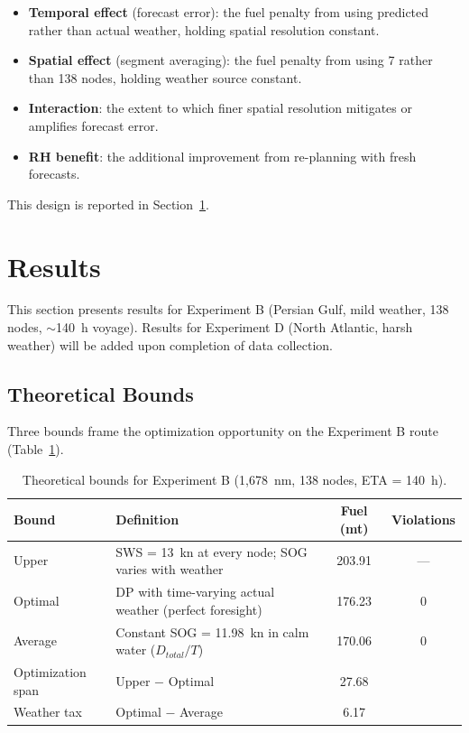 \documentclass[review]{elsarticle}
\begin{document}
\begin{itemize}
    \item \textbf{Temporal effect} (forecast error): the fuel penalty from using predicted rather than actual weather, holding spatial resolution constant.
    \item \textbf{Spatial effect} (segment averaging): the fuel penalty from using 7 rather than 138 nodes, holding weather source constant.
    \item \textbf{Interaction}: the extent to which finer spatial resolution mitigates or amplifies forecast error.
    \item \textbf{RH benefit}: the additional improvement from re-planning with fresh forecasts.
\end{itemize}

This design is reported in Section~\ref{sec:results}.


\section{Results}
\label{sec:results}

This section presents results for Experiment B (Persian Gulf, mild weather, 138 nodes, $\sim$140~h voyage). Results for Experiment D (North Atlantic, harsh weather) will be added upon completion of data collection.

\subsection{Theoretical Bounds}
\label{sec:results-bounds}

Three bounds frame the optimization opportunity on the Experiment B route (Table~\ref{tab:bounds}).

\begin{table}[htbp]
\centering
\caption{Theoretical bounds for Experiment B (1,678~nm, 138 nodes, ETA = 140~h).}
\label{tab:bounds}
\begin{tabular}{llcc}
\toprule
Bound & Definition & Fuel (mt) & Violations \\
\midrule
Upper & SWS = 13~kn at every node; SOG varies with weather & 203.91 & --- \\
Optimal & DP with time-varying actual weather (perfect foresight) & 176.23 & 0 \\
Average & Constant SOG = 11.98~kn in calm water ($D_{total}/T$) & 170.06 & 0 \\
\midrule
Optimization span & Upper $-$ Optimal & 27.68 & \\
Weather tax & Optimal $-$ Average & 6.17 & \\
\bottomrule
\end{tabular}
\end{table}
\end{document}
